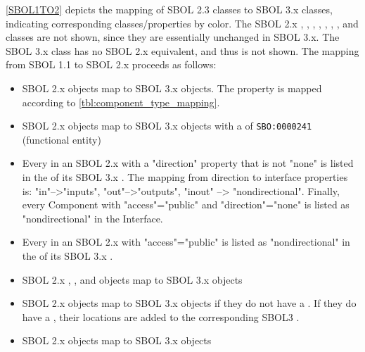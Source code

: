 \ref{SBOL1TO2} depicts the mapping of SBOL 2.3 classes to SBOL 3.x classes, indicating corresponding classes/properties by color.   The SBOL 2.x , , , , , , , and  classes are not shown, since they are essentially unchanged in SBOL 3.x.  The SBOL 3.x  class has no SBOL 2.x equivalent, and thus is not shown.
The mapping from SBOL 1.1 to SBOL 2.x proceeds as follows:
\begin{itemize}
    \item SBOL 2.x  objects map to SBOL 3.x  objects.  The  property is mapped according to  \ref{tbl:component_type_mapping}.
    \item SBOL 2.x  objects map to SBOL 3.x  objects with a  of \texttt{SBO:0000241} (functional entity)
    \item Every  in an SBOL 2.x  with a "direction" property that is not "none" is listed in the  of its SBOL 3.x . The mapping from direction to interface properties is: "in"-->"inputs", "out"-->"outputs", "inout" --> "nondirectional". Finally, every Component with "access"="public" and "direction"="none" is listed as "nondirectional" in the Interface.
    \item Every  in an SBOL 2.x  with "access"="public" is listed as "nondirectional" in the  of its SBOL 3.x .
    \item SBOL 2.x , , and  objects map to SBOL 3.x  objects
    \item SBOL 2.x  objects map to SBOL 3.x  objects if they do not have a . If they do have a , their locations are added to the corresponding SBOL3 .
    \item SBOL 2.x  objects map to SBOL 3.x  objects

\end{itemize}
